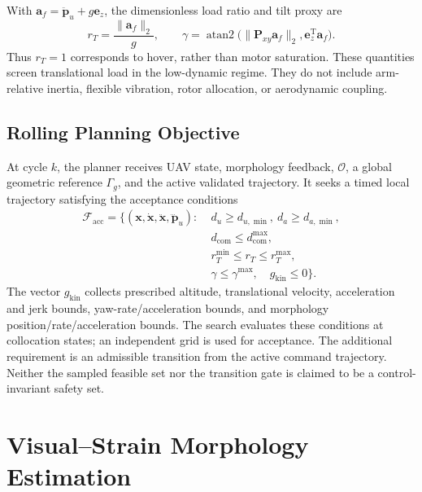 \documentclass[journal,twoside]{IEEEtran}
\begin{document}
With $\mathbf a_f=\ddot{\mathbf p}_u+g\mathbf e_z$, the dimensionless load ratio and tilt proxy are
\begin{equation}
r_T=\frac{\|\mathbf a_f\|_2}{g},\qquad
\gamma=\operatorname{atan2}\big(\|\mathbf P_{xy}\mathbf a_f\|_2,
\mathbf e_z^{\mathrm T}\mathbf a_f\big).
\label{eq:flight_proxy}
\end{equation}
Thus $r_T=1$ corresponds to hover, rather than motor saturation. These quantities screen translational load in the low-dynamic regime. They do not include arm-relative inertia, flexible vibration, rotor allocation, or aerodynamic coupling.

\subsection{Rolling Planning Objective}
At cycle $k$, the planner receives UAV state, morphology feedback, $\mathcal O$, a global geometric reference $\Gamma_g$, and the active validated trajectory. It seeks a timed local trajectory satisfying the acceptance conditions
\begin{equation}
\begin{aligned}
\mathcal F_{\mathrm{acc}}=\{(\mathbf x,\dot{\mathbf x},\ddot{\mathbf x},\dddot{\mathbf p}_u):\;&
d_u\ge d_{u,\min},\ d_a\ge d_{a,\min},\\
&d_{\mathrm{com}}\le d_{\mathrm{com}}^{\max},\\
&r_T^{\min}\le r_T\le r_T^{\max},\\
&\gamma\le\gamma^{\max},\quad g_{\mathrm{kin}}\le0\}.
\end{aligned}
\label{eq:acceptance_set}
\end{equation}
The vector $g_{\mathrm{kin}}$ collects prescribed altitude, translational velocity, acceleration and jerk bounds, yaw-rate/acceleration bounds, and morphology position/rate/acceleration bounds. The search evaluates these conditions at collocation states; an independent grid is used for acceptance. The additional requirement is an admissible transition from the active command trajectory. Neither the sampled feasible set nor the transition gate is claimed to be a control-invariant safety set.

\section{Visual--Strain Morphology Estimation}\label{sec:estimation}
\end{document}
